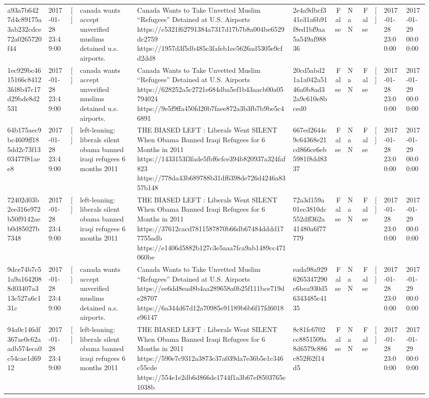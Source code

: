 \begin{tabular}{llllllrlrlll}
a93a7b6427d4c89175a3ab232cdce72a0265720f44 & 2017-01-28 23:49:00 & [] & canada wants accept unverified muslims detained u.s. airports. & Canada Wants to Take Unvetted Muslim “Refugees” Detained at U.S. Airports https://c5321f62791384a7317d17b7b8a004be6529dc2759 https://1957d3f5db485c3fafeb1ec5626ad5305e9cfd2dd8 & 2e4a9dbcf341e31a6b91f8ed1bf9aa5a549af98836 & False & NaN & False & [] & 2017-01-28 23:00:00 & 2017-01-29 00:00:00 \\
1ec929bc4615166c84123fd8b47c17d29bde8d2531 & 2017-01-28 23:49:00 & [] & canada wants accept unverified muslims detained u.s. airports. & Canada Wants to Take Unvetted Muslim “Refugees” Detained at U.S. Airports https://628252a5c2721e684dba5ef1b43aacb00a05794024 https://9e5f9ffa450fd20b7faee872a3b3fb7b9be5c46891 & 20cd5abd21a1a042a5146a0b8ad32a9c610e8bced0 & False & NaN & False & [] & 2017-01-28 23:00:00 & 2017-01-29 00:00:00 \\
64b175aec9bc4609ff185dd2c73f1303477f81aee8 & 2017-01-28 23:49:00 & [] & left-leaning: liberals silent obama banned iraqi refugees 6 months 2011 & THE BIASED LEFT : Liberals Went SILENT When Obama Banned Iraqi Refugees for 6 Months in 2011 https://1433153f3fade5fbf6cfce394b820937a324faf823 https://778da43b689788b31df6398de726d4246a8357b148 & 667ed2644c9c64368e21cd866ce6eb5981f8dd8337 & False & NaN & False & [] & 2017-01-28 23:00:00 & 2017-01-29 00:00:00 \\
72402d03b2ee316e972b50f9142aeb0d85027b7348 & 2017-01-28 23:49:00 & [] & left-leaning: liberals silent obama banned iraqi refugees 6 months 2011 & THE BIASED LEFT : Liberals Went SILENT When Obama Banned Iraqi Refugees for 6 Months in 2011 https://37612cacd7811587870b66db67484dddd177755adb https://e1406d5882b127c3e5aaa7fca9ab1489cc471060be & 72a3d159a01ec3810dc552dff362a41480a6f77779 & False & NaN & False & [] & 2017-01-28 23:00:00 & 2017-01-29 00:00:00 \\
9dce74b7c51a9a1642088d03407a313c527a6c131c & 2017-01-28 23:49:00 & [] & canada wants accept unverified muslims detained u.s. airports. & Canada Wants to Take Unvetted Muslim “Refugees” Detained at U.S. Airports https://ee6dd8ead8b4aa289658a0b25f111bce719de28707 https://6a344d67d12a70985e91189b6b6f17fd6018e96147 & eada98a9296265347290c6bea930d56343485c4135 & False & NaN & False & [] & 2017-01-28 23:00:00 & 2017-01-29 00:00:00 \\
94a0c146df367ae0c62aadb574eca0c54cae1d6912 & 2017-01-28 23:49:00 & [] & left-leaning: liberals silent obama banned iraqi refugees 6 months 2011 & THE BIASED LEFT : Liberals Went SILENT When Obama Banned Iraqi Refugees for 6 Months in 2011 https://590e7c9312a3873c37a039da7e36b5e1c346c55cde https://554e1e2db6d866de1744f1a3b67ef8503765e1038b & 8c81fc6702cc8851509a8d6579c886c852f62f14d5 & False & NaN & False & [] & 2017-01-28 23:00:00 & 2017-01-29 00:00:00 \\

\end{tabular}
